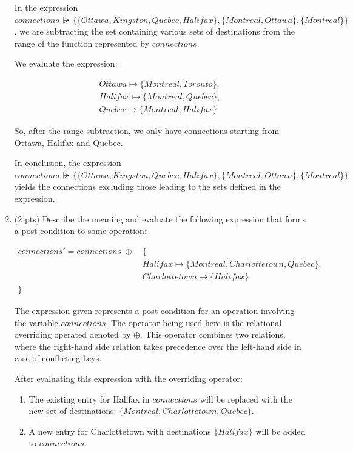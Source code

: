 \documentclass[12pt]{article}
\begin{document}
\begin{spacing}{1.5}
\begin{enumerate}
		      In the expression $connections \: \rsub \: \{\{Ottawa, Kingston, Quebec, Halifax\},\{Montreal, Ottawa\},\{Montreal\}\}$, we are subtracting the set containing various sets of destinations from the range of the function represented by $connections$.
		      
		      We evaluate the expression:
		      
		      \begin{align*}
		      	Ottawa \mapsto \{Montreal, Toronto\}, \\
		      	Halifax \mapsto \{Montreal, Quebec\}, \\
		      	Quebec \mapsto \{Montreal, Halifax\}  
		      \end{align*}
		      
		      So, after the range subtraction, we only have connections starting from Ottawa, Halifax and Quebec.
		      
		      In conclusion, the expression $connections \: \rsub \: \{\{Ottawa, Kingston, Quebec, Halifax\},\{Montreal, Ottawa\},\{Montreal\}\}$ yields the connections excluding those leading to the sets defined in the expression.
		      
		\item (2 pts) Describe the meaning and evaluate the following expression that forms a post-condition to some operation:
		      
		      \begin{align*}connections'=connections \: \oplus \: & \{  \\
		      	            & Halifax \mapsto \{Montreal, Charlottetown, Quebec\},    \\
		      	            & Charlottetown \mapsto \{Halifax\}                       \\
		      	\}          & \end{align*}                                            \newline
		      	
		      	The expression given represents a post-condition for an operation involving the variable $connections$. The operator being used here is the relational overriding operated denoted by $\oplus$. This operator combines two relations, where the right-hand side relation takes precedence over the left-hand side in case of conflicting keys.
		      	
		      	After evaluating this expression with the overriding operator:
		      	
		      	\begin{enumerate}
		      	\item The existing entry for Halifax in $connections$ will be replaced with the new set of destinations: $\{Montreal, Charlottetown, Quebec\}$.
		      	\item A new entry for Charlottetown with destinations $\{Halifax\}$ will be added to $connections$.
		      	\end{enumerate}
		      	

\end{enumerate}
\end{spacing}
\end{document}
